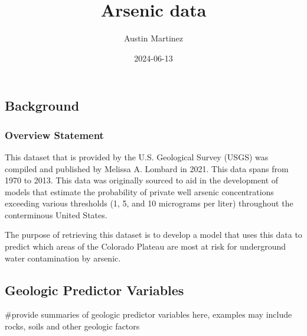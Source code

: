\documentclass[
]{article}
\title{Arsenic data}
\author{Austin Martinez}
\date{2024-06-13}
\begin{document}
\maketitle

\hypertarget{background}{%
\subsection{Background}\label{background}}

\hypertarget{overview-statement}{%
\subsubsection{Overview Statement}\label{overview-statement}}

This dataset that is provided by the U.S. Geological Survey (USGS) was
compiled and published by Melissa A. Lombard in 2021. This data spans
from 1970 to 2013. This data was originally sourced to aid in the
development of models that estimate the probability of private well
arsenic concentrations exceeding various thresholds (1, 5, and 10
micrograms per liter) throughout the conterminous United States.

The purpose of retrieving this dataset is to develop a model that uses
this data to predict which areas of the Colorado Plateau are most at
risk for underground water contamination by arsenic.

\hypertarget{geologic-predictor-variables}{%
\subsection{Geologic Predictor
Variables}\label{geologic-predictor-variables}}

\#provide summaries of geologic predictor variables here, examples may
include rocks, soils and other geologic factors
\end{document}
